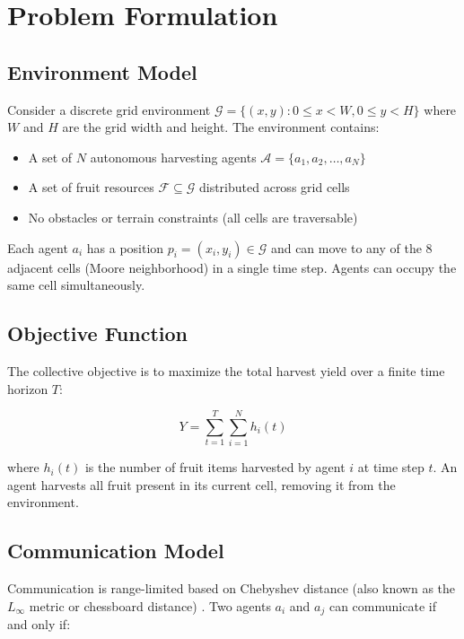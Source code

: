 \section{Problem Formulation}

\subsection{Environment Model}

Consider a discrete grid environment $\mathcal{G} = \{(x,y) : 0 \le x < W, 0 \le y < H\}$ where $W$ and $H$ are the grid width and height. The environment contains:

\begin{itemize}
    \item A set of $N$ autonomous harvesting agents $\mathcal{A} = \{a_1, a_2, \ldots, a_N\}$
    \item A set of fruit resources $\mathcal{F} \subseteq \mathcal{G}$ distributed across grid cells
    \item No obstacles or terrain constraints (all cells are traversable)
\end{itemize}

Each agent $a_i$ has a position $p_i = (x_i, y_i) \in \mathcal{G}$ and can move to any of the 8 adjacent cells (Moore neighborhood) in a single time step. Agents can occupy the same cell simultaneously.

\subsection{Objective Function}

The collective objective is to maximize the total harvest yield over a finite time horizon $T$:

\begin{equation}
Y = \sum_{t=1}^{T} \sum_{i=1}^{N} h_i(t)
\end{equation}

where $h_i(t)$ is the number of fruit items harvested by agent $i$ at time step $t$. An agent harvests all fruit present in its current cell, removing it from the environment.

\subsection{Communication Model}

Communication is range-limited based on Chebyshev distance (also known as the $L_\infty$ metric or chessboard distance) \citep{deza2009encyclopedia}. Two agents $a_i$ and $a_j$ can communicate if and only if:

